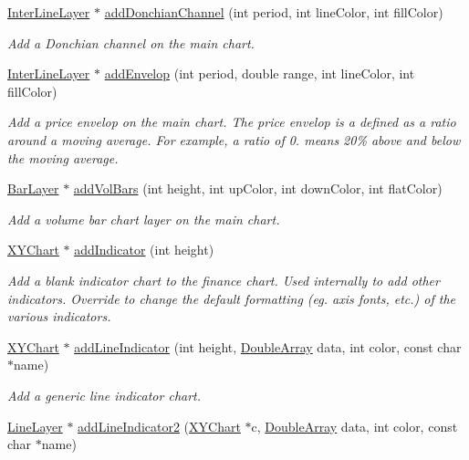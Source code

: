 \begin{DoxyCompactItemize}
\hyperlink{class_inter_line_layer}{Inter\+Line\+Layer} $\ast$ \hyperlink{class_finance_chart_af42c518b1f7caa9d73169153fced5bd9}{add\+Donchian\+Channel} (int period, int line\+Color, int fill\+Color)
\begin{DoxyCompactList}\small\item\em Add a Donchian channel on the main chart. \end{DoxyCompactList}\item 
\hyperlink{class_inter_line_layer}{Inter\+Line\+Layer} $\ast$ \hyperlink{class_finance_chart_a92bd5e67f5eaeb0fd801614c4ede9c43}{add\+Envelop} (int period, double range, int line\+Color, int fill\+Color)
\begin{DoxyCompactList}\small\item\em Add a price envelop on the main chart. The price envelop is a defined as a ratio around a moving average. For example, a ratio of 0. means 20\% above and below the moving average. \end{DoxyCompactList}\item 
\hyperlink{class_bar_layer}{Bar\+Layer} $\ast$ \hyperlink{class_finance_chart_aa1405175c2d8761adcf41c5529ef4613}{add\+Vol\+Bars} (int height, int up\+Color, int down\+Color, int flat\+Color)
\begin{DoxyCompactList}\small\item\em Add a volume bar chart layer on the main chart. \end{DoxyCompactList}\item 
\hyperlink{class_x_y_chart}{X\+Y\+Chart} $\ast$ \hyperlink{class_finance_chart_a2e27a54f9787005383604fe1ebac4c58}{add\+Indicator} (int height)
\begin{DoxyCompactList}\small\item\em Add a blank indicator chart to the finance chart. Used internally to add other indicators. Override to change the default formatting (eg. axis fonts, etc.) of the various indicators. \end{DoxyCompactList}\item 
\hyperlink{class_x_y_chart}{X\+Y\+Chart} $\ast$ \hyperlink{class_finance_chart_a799daf3775d8e100cd771eba230252ff}{add\+Line\+Indicator} (int height, \hyperlink{class_double_array}{Double\+Array} data, int color, const char $\ast$name)
\begin{DoxyCompactList}\small\item\em Add a generic line indicator chart. \end{DoxyCompactList}\item 
\hyperlink{class_line_layer}{Line\+Layer} $\ast$ \hyperlink{class_finance_chart_af7000f18368de197ff56bf5dba1f711c}{add\+Line\+Indicator2} (\hyperlink{class_x_y_chart}{X\+Y\+Chart} $\ast$c, \hyperlink{class_double_array}{Double\+Array} data, int color, const char $\ast$name)

\end{DoxyCompactItemize}
